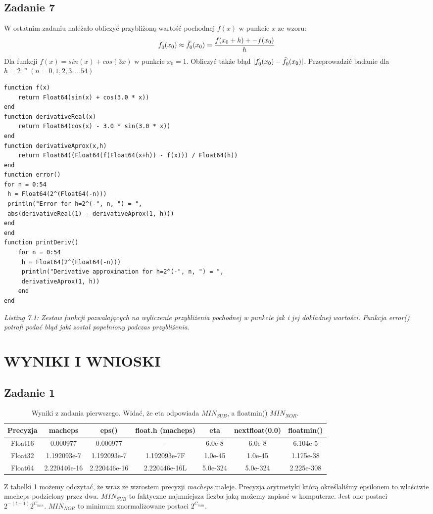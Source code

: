 \documentclass[]{article}
\begin{document}
\subsection{Zadanie 7}
W ostatnim zadaniu należało obliczyć przybliżoną wartość pochodnej \(f(x)\) w punkcie \(x\) ze wzoru: \[ f^`_0(x_0) \approx  \tilde{f}^`_0(x_0) = \frac{f(x_0 + h) + - f(x_0)}{ h}\]
Dla funkcji \(f(x) = sin(x) + cos(3x)\) w punkcie \(x_0 = 1\). \newline Obliczyć także błąd \(|f^`_0(x_0) - \tilde{f}^`_0(x_0)|\). \newline
Przeprowadzić badanie dla \(h = 2^{-n} \: (n = 0,1,2,3,...54)\)
\begin{lstlisting}
function f(x)
	return Float64(sin(x) + cos(3.0 * x))
end
function derivativeReal(x) 
	return Float64(cos(x) - 3.0 * sin(3.0 * x))
end
function derivativeAprox(x,h) 
	return Float64((Float64(f(Float64(x+h)) - f(x))) / Float64(h))
end
function error()
for n = 0:54
 h = Float64(2^(Float64(-n)))
 println("Error for h=2^(-", n, ") = ",
 abs(derivativeReal(1) - derivativeAprox(1, h)))
end
end
function printDeriv()
	for n = 0:54
	 h = Float64(2^(Float64(-n)))
	 println("Derivative approximation for h=2^(-", n, ") = ",
	 derivativeAprox(1, h))
	end
end
\end{lstlisting}
\textit{Listing 7.1: Zestaw funkcji pozwalających na wyliczenie przybliżenia pochodnej w punkcie jak i jej dokładnej wartości. Funkcja error() potrafi podać błąd jaki został popełniony podczas przybliżenia.}
\section{WYNIKI I WNIOSKI}
\subsection{Zadanie 1}
\begin{table}[h!]
	\centering
	\begin{tabular}{||c c c c c c c||} 
		\hline
		Precyzja & macheps & eps() & float.h (macheps) & eta & nextfloat(0.0) & floatmin()\\ [0.5ex] 
		\hline\hline
		Float16 & 0.000977 & 0.000977 & - & 6.0e-8 & 6.0e-8 & 6.104e-5\\ 
		Float32 & 1.192093e-7 & 1.192093e-7 & 1.192093e-7F & 1.0e-45 & 1.0e-45 & 1.175e-38\\
		Float64 & 2.220446e-16 & 2.220446e-16 & 2.220446e-16L & 5.0e-324 & 5.0e-324 & 2.225e-308\\
		\hline
	\end{tabular}
\caption{Wyniki z zadania pierwszego. Widać, że eta odpowiada \(MIN_{SUB}\), a floatmin() \(MIN_{NOR}\).}
\end{table}
Z tabelki 1 możemy odczytać, że wraz ze wzrostem precyzji \textit{macheps} maleje. Precyzja arytmetyki którą określaliśmy epsilonem to właściwie macheps podzielony przez dwa.
\(MIN_{SUB}\) to faktyczne najmniejsza liczba jaką możemy zapisać w komputerze.
Jest ono postaci \(2^{-(t-1)}2^{C_{min}}\). 
\(MIN_{NOR}\) to minimum znormalizowane postaci \(2^{C_{min}}\).
\end{document}
